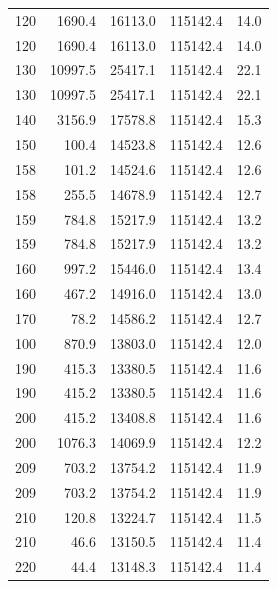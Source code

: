 \begin{table}[htbp]
\begin{tabular}{rrrrr}
    120 & \num{1690.4} & \num{16113.0} & \num{115142.4} & 14.0 \\
    120 & \num{1690.4} & \num{16113.0} & \num{115142.4} & 14.0 \\
    130 & \num{10997.5} & \num{25417.1} & \num{115142.4} & 22.1 \\
    130 & \num{10997.5} & \num{25417.1} & \num{115142.4} & 22.1 \\
    140 & \num{3156.9} & \num{17578.8} & \num{115142.4} & 15.3 \\
    150 & \num{100.4} & \num{14523.8} & \num{115142.4} & 12.6 \\
    158 & \num{101.2} & \num{14524.6} & \num{115142.4} & 12.6 \\
    158 & \num{255.5} & \num{14678.9} & \num{115142.4} & 12.7 \\
    159 & \num{784.8} & \num{15217.9} & \num{115142.4} & 13.2 \\
    159 & \num{784.8} & \num{15217.9} & \num{115142.4} & 13.2 \\
    160 & \num{997.2} & \num{15446.0} & \num{115142.4} & 13.4 \\
    160 & \num{467.2} & \num{14916.0} & \num{115142.4} & 13.0 \\
    170 & \num{78.2} & \num{14586.2} & \num{115142.4} & 12.7 \\
    100 & \num{870.9} & \num{13803.0} & \num{115142.4} & 12.0 \\
    190 & \num{415.3} & \num{13380.5} & \num{115142.4} & 11.6 \\
    190 & \num{415.2} & \num{13380.5} & \num{115142.4} & 11.6 \\
    200 & \num{415.2} & \num{13408.8} & \num{115142.4} & 11.6 \\
    200 & \num{1076.3} & \num{14069.9} & \num{115142.4} & 12.2 \\
    209 & \num{703.2} & \num{13754.2} & \num{115142.4} & 11.9 \\
    209 & \num{703.2} & \num{13754.2} & \num{115142.4} & 11.9 \\
    210 & \num{120.8} & \num{13224.7} & \num{115142.4} & 11.5 \\
    210 & \num{46.6} & \num{13150.5} & \num{115142.4} & 11.4 \\
    220 & \num{44.4} & \num{13148.3} & \num{115142.4} & 11.4 \\
    \bottomrule
  \end{tabular}
\end{table}
